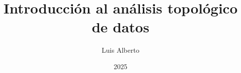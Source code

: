 \documentclass[12pt,oneside]{book}
\theoremstyle{definition}
\begin{document}
\author{Luis Alberto}
\title{Introducción al análisis topológico de datos}
\date{2025}

\frontmatter
\maketitle
\tableofcontents

\mainmatter



\backmatter
\end{document}
